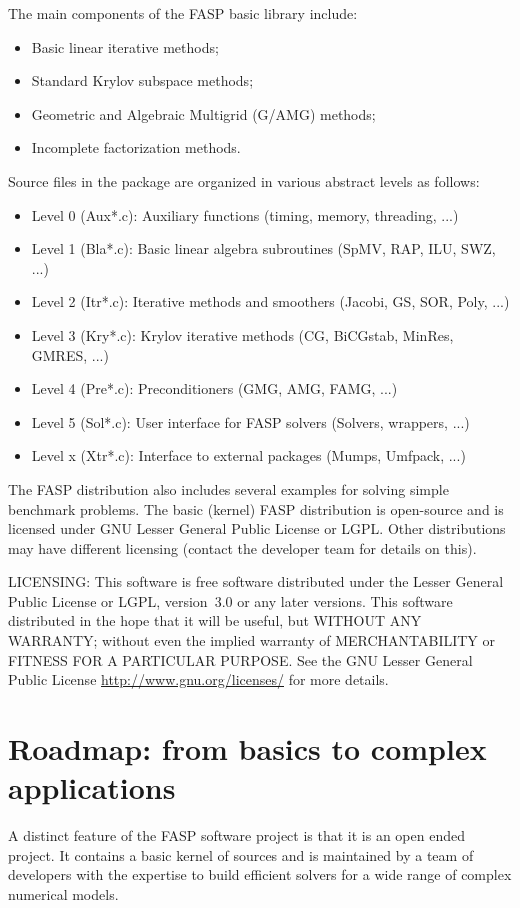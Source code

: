 \documentclass[11pt]{memoir}
\begin{document}
The main components of the FASP basic library include:
\begin{itemize}\setlength{\itemsep}{-1mm}
\item Basic linear iterative methods;
\item Standard Krylov subspace methods;
\item Geometric and Algebraic Multigrid (G/AMG) methods;
\item Incomplete factorization methods.
\end{itemize}
Source files in the package are organized in various abstract levels as follows:
\begin{itemize}\setlength{\itemsep}{-1mm}
\item Level 0 (Aux*.c): Auxiliary functions (timing, memory, threading, ...)
\item Level 1 (Bla*.c): Basic linear algebra subroutines (SpMV, RAP, ILU, SWZ, ...)
\item Level 2 (Itr*.c): Iterative methods and smoothers (Jacobi, GS, SOR, Poly, ...)
\item Level 3 (Kry*.c): Krylov iterative methods (CG, BiCGstab, MinRes, GMRES, ...)
\item Level 4 (Pre*.c): Preconditioners (GMG, AMG, FAMG, ...)
\item Level 5 (Sol*.c): User interface for FASP solvers (Solvers, wrappers, ...)
\item Level x (Xtr*.c): Interface to external packages (Mumps, Umfpack, ...)
\end{itemize}

The FASP distribution also includes several examples for solving
simple benchmark problems.
%
The basic (kernel) FASP distribution is
open-source and is licensed under GNU Lesser General Public License or
LGPL. Other distributions may have different licensing (contact the
developer team for details on this).
%
\begin{snugshade}\noindent
  LICENSING: This software is free software distributed under the Lesser
  General Public License or LGPL, version~3.0 or any later
  versions. This software distributed in the hope that it will be
  useful, but WITHOUT ANY WARRANTY; without even the implied warranty
  of MERCHANTABILITY or FITNESS FOR A PARTICULAR PURPOSE. See the GNU
  Lesser General Public License \url{http://www.gnu.org/licenses/} for
  more details.
\end{snugshade}

\section{Roadmap: from basics to complex applications} 
A distinct feature of the FASP software project is that it is an open
ended project. It contains a basic kernel of sources and is maintained
by a team of developers with the expertise to build efficient solvers
for a wide range of complex numerical models.
\end{document}

